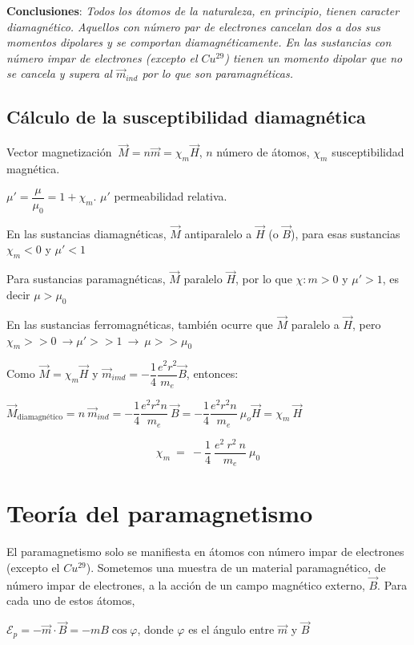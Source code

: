 \begin{miparrafodestacado}
	\textbf{Conclusiones}: \emph{Todos los átomos de la naturaleza, en principio, tienen caracter diamagnético. Aquellos con número par de electrones cancelan dos a dos sus momentos dipolares y se comportan diamagnéticamente. En las sustancias con número impar de electrones (excepto el $Cu^{29}$) tienen un momento dipolar que no se cancela y supera al $\vec m_{ind}$ por lo que son paramagnéticas. }
\end{miparrafodestacado}

\subsection{Cálculo de la susceptibilidad diamagnética}

Vector magnetización $\ \vec M=n\vec m=\chi_m \vec H$, $n$ número de átomos, $\chi_m$ susceptibilidad magnética.

$\mu'=\dfrac{\mu}{\mu_0}=1+\chi_m$. $\mu'$ permeabilidad relativa.

En las sustancias diamagnéticas, $\vec M$ antiparalelo a $\vec H$ (o $\vec B$), para esas sustancias $\chi_m<0$ y $\mu'<1$

Para sustancias paramagnéticas, $\vec M$ paralelo $\vec H$, por lo que $\chi:m>0$ y $\mu'>1$, es decir $\mu>\mu_0$

En las sustancias ferromagnéticas, también ocurre que $\vec M$ paralelo a $\vec H$, pero $\chi_m>>0 \ \to \mu' >> 1 \ \to \ \mu >>\mu_0$

Como $\vec M=\chi_m \vec H$ y $\vec m_{imd}=-\dfrac 1 4 \dfrac{e^2r^2}{m_e}\vec B$, entonces:

$\vec M_{\text{diamagnético}}= n\  \vec m_{ind} = - \dfrac 1 4 \dfrac{e^2r^2n}{m_e} \ \vec B=- \dfrac 1 4 \dfrac{e^2r^2n}{m_e} \ \mu_o \vec H=\chi_m \ \vec H$

$$\chi_m \ = \ -\dfrac 1 4 \ \dfrac{e^2\ r^2\ n}{m_e} \ \mu_0$$

\section{Teoría del paramagnetismo}

El paramagnetismo solo se manifiesta en átomos con número impar de electrones (excepto el $Cu^{29}$). Sometemos una muestra de un material paramagnético, de número impar de electrones, a la acción de un campo magnético externo, $\vec B$. Para cada uno de estos átomos, 

$\mathcal E_p=-\vec m \cdot \vec B=-mB\cos \varphi$, donde $\varphi$ es el ángulo entre $\vec m$ y $\vec B$

